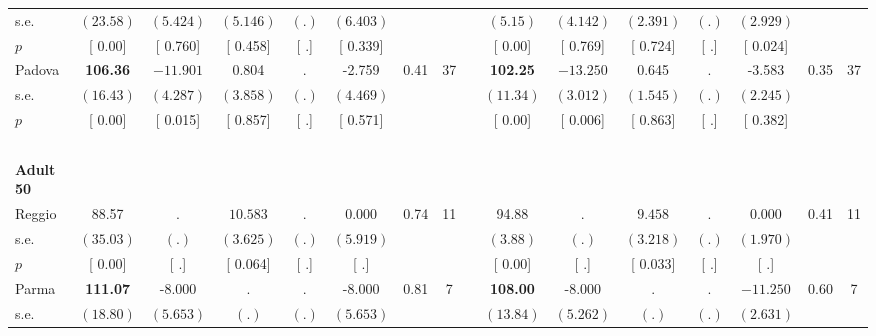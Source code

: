 \begin{longtable}{L{8em} c c c c c c c p{1em} c c c c c c c}
\quad \quad \quad \quad s.e.& $ (    23.58)$ & $ (    5.424)$ & $ (    5.146)$ & $ (        .)$ & $ (    6.403)$ & & & & $ (     5.15)$ & $ (    4.142)$ & $ (    2.391)$ & $ (        .)$ & $ (    2.929)$ & &  \\*
\quad \quad \quad \quad $ p$ & [     0.00] & [    0.760] & [    0.458] & [        .] & [    0.339] & & & & [     0.00] & [    0.769] & [    0.724] & [        .] & [    0.024] & &  \\[1em]
\quad \quad \quad Padova& \textbf{   106.36} & $ \mathbf{  -11.901}$ &     0.804 &         . &    -2.759 &      0.41 &        37 & & \textbf{   102.25} & $ \mathbf{  -13.250}$ &     0.645 &         . &    -3.583 &      0.35 &        37  \\*
\quad \quad \quad \quad s.e.& $ (    16.43)$ & $ (    4.287)$ & $ (    3.858)$ & $ (        .)$ & $ (    4.469)$ & & & & $ (    11.34)$ & $ (    3.012)$ & $ (    1.545)$ & $ (        .)$ & $ (    2.245)$ & &  \\*
\quad \quad \quad \quad $ p$ & [     0.00] & [    0.015] & [    0.857] & [        .] & [    0.571] & & & & [     0.00] & [    0.006] & [    0.863] & [        .] & [    0.382] & &  \\[1em]
~\\[1em]
\quad \quad \textbf{Adult 50} & & & & & & & & & & & & & & & \\* 
\quad \quad \quad Reggio& 88.57 &         . & $ \mathbf{   10.583}$ &         . &     0.000 &      0.74 &        11 & & 94.88 &         . & $ \mathbf{    9.458}$ &         . &     0.000 &      0.41 &        11  \\*
\quad \quad \quad \quad s.e.& $ (    35.03)$ & $ (        .)$ & $ (    3.625)$ & $ (        .)$ & $ (    5.919)$ & & & & $ (     3.88)$ & $ (        .)$ & $ (    3.218)$ & $ (        .)$ & $ (    1.970)$ & &  \\*
\quad \quad \quad \quad $ p$ & [     0.00] & [        .] & [    0.064] & [        .] & [        .] & & & & [     0.00] & [        .] & [    0.033] & [        .] & [        .] & &  \\[1em]
\quad \quad \quad Parma& \textbf{   111.07} &    -8.000 &         . &         . &    -8.000 &      0.81 &         7 & & \textbf{   108.00} &    -8.000 &         . &         . & $ \mathbf{  -11.250}$ &      0.60 &         7  \\*
\quad \quad \quad \quad s.e.& $ (    18.80)$ & $ (    5.653)$ & $ (        .)$ & $ (        .)$ & $ (    5.653)$ & & & & $ (    13.84)$ & $ (    5.262)$ & $ (        .)$ & $ (        .)$ & $ (    2.631)$ & &  \\*

\end{longtable}
